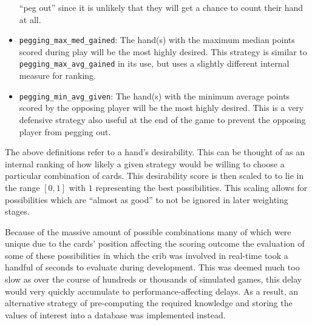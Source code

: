 \begin{itemize}
		``peg out''
	since it is unlikely that they will get a chance to count their hand at all.
\item \texttt{pegging\_max\_med\_gained}:
	The hand(s) with the maximum median points scored during play will be the most
	highly desired.
	This strategy is similar to \texttt{pegging\_max\_avg\_gained} in its use,
	but uses a slightly different internal measure for ranking.
\item \texttt{pegging\_min\_avg\_given}:
	The hand(s) with the minimum average points scored by the opposing player
	will be the most highly desired.
	This is a very defensive strategy also useful at the end of the game to
	prevent the opposing player from pegging out.
\end{itemize}
%
The above definitions refer to a hand's desirability.
%
This can be thought of as an internal ranking of how likely a given strategy
would be willing to choose a particular combination of cards.
%
This desirability score is then scaled to to lie in the range $[0, 1]$ with
$1$ representing the best possibilities.
%
This scaling allows for possibilities which are ``almost as good'' to not be
ignored in later weighting stages.




Because of the massive amount of possible combinations%
\textemdash many of which were unique due to the cards' position affecting the
scoring outcome\textemdash%
the evaluation of some of these possibilities in which the crib was involved
in real-time took a handful of seconds to evaluate during development.
%
This was deemed much too slow as over the course of hundreds or thousands of
simulated games,
this delay would very quickly accumulate to performance-affecting delays.
%
As a result, an alternative strategy of pre-computing the required knowledge and
storing the values of interest into a database was implemented instead.

